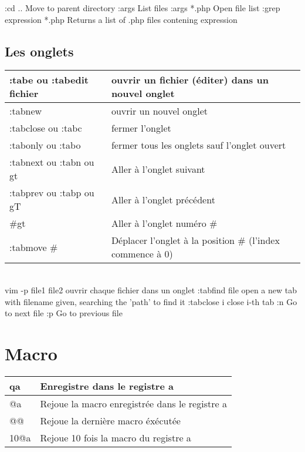 \documentclass{article}
\begin{document}
                    :cd .. Move to parent directory
                    :args List files
                    :args *.php Open file list
                    :grep expression *.php Returns a list of .php files contening expression

                    \subsection{Les onglets}
                    \begin{tabular}{|p{3cm}| l| }\hline
                        :tabe ou :tabedit  fichier & ouvrir un fichier (éditer) dans un nouvel onglet\\ \hline
                        :tabnew   & ouvrir un nouvel onglet \\ \hline
                        :tabclose ou :tabc & fermer l'onglet\\ \hline
                        :tabonly ou :tabo & fermer tous les onglets sauf l'onglet ouvert\\ \hline
                        :tabnext ou :tabn  ou gt & Aller à l'onglet suivant\\ \hline
                        :tabprev ou :tabp  ou gT & Aller à l'onglet précédent\\ \hline
                        \#gt & Aller à l'onglet numéro \# \\ \hline
                        :tabmove \# & Déplacer l'onglet à la position \# (l'index commence à 0) \\ \hline

                    \end{tabular}\\
                    vim -p file1 file2 ouvrir chaque fichier dans un onglet
                    :tabfind {file} open a new tab with filename given, searching the 'path' to find it
                    :tabclose {i} close i-th tab
                    :n Go to next file
                    :p Go to previous file

                    \section{Macro}
                    \begin{tabular}{|p{3cm}| l| }\hline
                        qa & Enregistre dans le registre a \\ \hline
                        @a & Rejoue la macro enregistrée dans le registre a \\ \hline
                        @@ & Rejoue la dernière macro éxécutée \\ \hline
                        10@a & Rejoue 10 fois la macro du registre a \\ \hline
                    \end{tabular}\\
\end{document}

